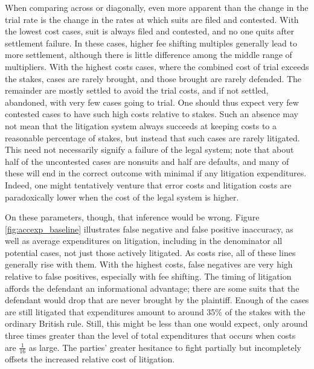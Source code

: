 \documentclass{article}
\begin{document}
When comparing across or diagonally, even more apparent than the change in the trial rate is the change in the rates at which suits are filed and contested.  With the lowest cost cases, suit is always filed and contested, and no one quits after settlement failure. In these cases, higher fee shifting multiples generally lead to more settlement, although there is little difference among the middle range of multipliers. With the highest costs cases, where the combined cost of trial exceeds the stakes, cases are rarely brought, and those brought are rarely defended. The remainder are mostly settled to avoid the trial costs, and if not settled, abandoned, with very few cases going to trial. One should thus expect very few contested cases to have such high costs relative to stakes. Such an absence may not mean that the litigation system always succeeds at keeping costs to a reasonable percentage of stakes, but instead that such cases are rarely litigated. This need not necessarily signify a failure of the legal system; note that about half of the uncontested cases are nonsuits and half are defaults, and many of these will end in the correct outcome with minimal if any litigation expenditures. Indeed, one might tentatively venture that error costs and litigation costs are paradoxically lower when the cost of the legal system is higher. 

On these parameters, though, that inference would be wrong. Figure \ref{fig:accexp_baseline} illustrates false negative and false positive inaccuracy, as well as average expenditures on litigation, including in the denominator all potential cases, not just those actively litigated. As costs rise, all of these lines generally rise with them. With the highest costs, false negatives are very high relative to false positives, especially with fee shifting. The timing of litigation affords the defendant an informational advantage; there are some suits that the defendant would drop that are never brought by the plaintiff. Enough of the cases are still litigated that expenditures amount to around 35\% of the stakes with the ordinary British rule. Still, this might be less than one would expect, only around three times greater than the level of total expenditures that occurs when costs are $\frac{1}{16}$ as large. The parties' greater hesitance to fight partially but incompletely offsets the increased relative cost of litigation.
\end{document}
